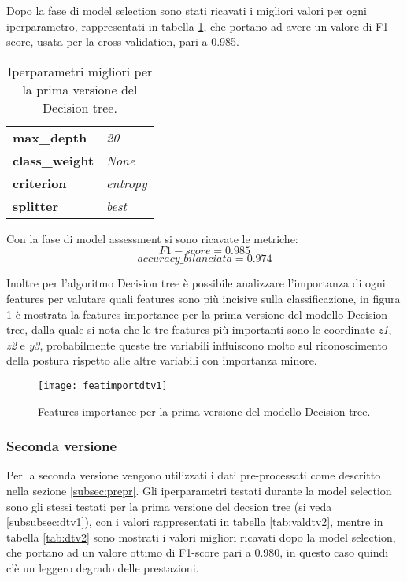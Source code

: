 Dopo la fase di model selection sono stati ricavati i migliori valori per ogni iperparametro, rappresentati in tabella \ref{tab:dtv1}, che portano ad avere un valore di F1-score, usata per la cross-validation, pari a 0.985.

\begin{table}[h] 
\centering
\begin{tabular}{l l}
\hline
\textbf{max\_depth} & \textit{20}\\
\textbf{class\_weight} & \textit{None}\\
\textbf{criterion} & \textit{entropy}\\
\textbf{splitter} & \textit{best}\\
\hline
\end{tabular}
\caption{Iperparametri migliori per la prima versione del Decision tree.}
\label{tab:dtv1}
\end{table}

Con la fase di model assessment si sono ricavate le metriche: $$F1-score = 0.985$$ $$accuracy\_bilanciata = 0.974$$

Inoltre per l'algoritmo Decision tree è possibile analizzare l'importanza di ogni features per valutare quali features sono più incisive sulla classificazione, in figura \ref{fig:featuresimportancedtv1} è mostrata la features importance per la prima versione del modello Decision tree, dalla quale si nota che le tre features più importanti sono le coordinate \textit{z1}, \textit{z2} e \textit{y3}, probabilmente queste tre variabili influiscono molto sul riconoscimento della postura rispetto alle altre variabili con importanza minore. 

\begin{figure}[h]
    \centering\texttt{[image: featimportdtv1]}
    \caption{Features importance per la prima versione del modello Decision tree.}
    \label{fig:featuresimportancedtv1}
\end{figure}

\subsubsection{Seconda versione}
Per la seconda versione vengono utilizzati i dati pre-processati come descritto nella sezione \ref{subsec:prepr}.  Gli iperparametri testati durante la model selection sono gli stessi testati per la prima versione del decsion tree (si veda \ref{subsubsec:dtv1}), con i valori rappresentati in tabella \ref{tab:valdtv2}, mentre in tabella \ref{tab:dtv2} sono mostrati i valori migliori ricavati dopo la model selection, che portano ad un valore ottimo di F1-score pari a 0.980, in questo caso quindi c'è un leggero degrado delle prestazioni.

